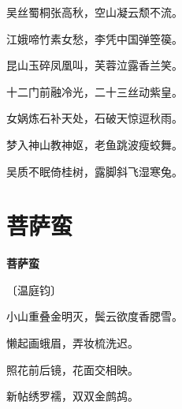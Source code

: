 \documentclass[12pt,UTF-8,openany,fontset=none]{ctexbook}
\begin{document}
    \vspace{18pt}  %

\begin{center}
    \begin{Large}

        吴丝蜀桐张高秋，空山凝云颓不流。

        江娥啼竹素女愁，李凭中国弹箜篌。

        昆山玉碎凤凰叫，芙蓉泣露香兰笑。

        十二门前融冷光，二十三丝动紫皇。

        女娲炼石补天处，石破天惊逗秋雨。

        梦入神山教神妪，老鱼跳波瘦蛟舞。

        吴质不眠倚桂树，露脚斜飞湿寒兔。

    \end{Large}

\end{center}

\vspace{8pt}
\clearpage

\section{菩萨蛮}


\begin{center}
    {\bfseries 菩萨蛮}

    \vspace{18pt}

    \begin{large}\xuwen
        〔温庭钧〕
    \end{large}

\end{center}

    \vspace{18pt}  %

\begin{center}
    \begin{Large}

        小山重叠金明灭，鬓云欲度香腮雪。

        懒起画蛾眉，弄妆梳洗迟。

        照花前后镜，花面交相映。

        新帖绣罗襦，双双金鹧鸪。

    \end{Large}

\end{center}
\end{document}

